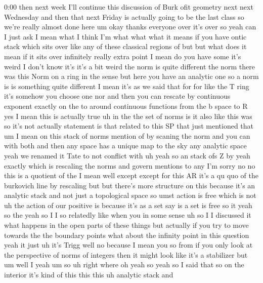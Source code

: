 \begin{unfinished}{0:00}
then  next  week  I'll  continue  this
discussion  of  Burk  ofit  geometry  next
next  Wednesday  and  then  that  next  Friday
is  actually  going  to  be  the  last  class
so  we're  really  almost  done
here
um  okay  thanks
everyone  over  it's  over
so  yeah  can  I  just  ask  I  mean  what  I
think  I'm  what  what  what  it  means  if  you
have  ontic  stack  which  sits  over  like
any  of  these  classical  regions  of  but
but  what  does  it  mean  if  it  sits  over
infinitely  really  extra  point  I  mean  do
you  have
some  it's
weird  I  don't  know  it's  it's  a  bit
weird  the  norm  is  quite  different  the
norm  there  was  this  Norm  on  a  ring  in
the  sense  but  here  you  have  an  analytic
one  so  a  norm  is  is  something  quite
different  I  mean  it's  as  we  said  that
for  for  like  the  T  ring  it's  somehow  you
choose  one  nor  and  then  you  can  rescate
by  continuous  exponent  exactly  on  the  to
around  continuous  functions  from  the  b
space  to  R  yes  I  mean  this  is  actually
true  uh  in  the  the  set  of  norms  is  it
also  like  this  was  so  it's
not  actually  statement  is  that  related
to  this  SP  that  just  mentioned  that  um  I
mean  on  this  stack  of  norms  mention
of  by  scaning  the  norm  and  you  can  with
both
and  then
any  space  has  a  unique  map  to  the
sky  any  analytic  space  yeah  we  renamed
it  Tate  to  not  conflict  with  uh  yeah
so  an  stack  ofs  Z  by  yeah  exactly  which
is  rescaling  the
norms  and  govern
mentions  to
any  I'm
sorry  no  no  this  is  a  quotient  of  the  I
mean  well  except  except  for  this  AR  it's
a  qu  quo  of  the  burkovich  line  by
rescaling  but  but  there's  more  structure
on  this  because  it's  an  analytic  stack
and  not  just  a  topological  space  so  umst
action  is  free  which  is
not  uh  the  action  of  our  positive  is
because  it's  as  a  set  say  is  a  set  is
free  so  it  yeah  so  the  yeah  so  I  I  so
relatedly  like  when  you  in  some  sense  uh
so  I  I  discussed  it  what  happens  in  the
open  parts  of  these  things  but  actually
if  you  try  to  move  towards  the  the
boundary  points  what  about  the  infinity
point  in  this
question  yeah  it  just  uh  it's  Trigg
well
no  because  I  mean  you  so  from  if  you
only  look  at  the  perspective  of  norms  of
integers  then  it  might  look  like  it's  a
stabilizer  but  um  well
I  yeah
um  so  uh  right  where  oh  yeah  so  yeah  so
I  said  that  so  on  the  interior  it's  kind
of  this  this  this  uh  analytic  stack  and

\end{unfinished}

